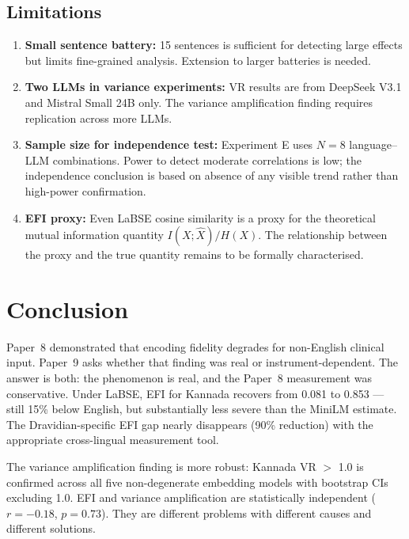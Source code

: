 \documentclass[11pt,a4paper]{article}
\begin{document}
\subsection{Limitations}

\begin{enumerate}
    \item \textbf{Small sentence battery:} 15 sentences is sufficient for detecting large
    effects but limits fine-grained analysis. Extension to larger batteries is needed.
    \item \textbf{Two LLMs in variance experiments:} VR results are from DeepSeek V3.1
    and Mistral Small 24B only. The variance amplification finding requires replication
    across more LLMs.
    \item \textbf{Sample size for independence test:} Experiment E uses $N = 8$ language--
    LLM combinations. Power to detect moderate correlations is low; the independence
    conclusion is based on absence of any visible trend rather than high-power
    confirmation.
    \item \textbf{EFI proxy:} Even LaBSE cosine similarity is a proxy for the theoretical
    mutual information quantity $I(X;\hat{X})/H(X)$. The relationship between the proxy
    and the true quantity remains to be formally characterised.
\end{enumerate}

\section{Conclusion}

Paper~8 demonstrated that encoding fidelity degrades for non-English clinical input.
Paper~9 asks whether that finding was real or instrument-dependent. The answer is both:
the phenomenon is real, and the Paper~8 measurement was conservative. Under LaBSE, EFI
for Kannada recovers from 0.081 to 0.853 --- still 15\% below English, but substantially
less severe than the MiniLM estimate. The Dravidian-specific EFI gap nearly disappears
(90\% reduction) with the appropriate cross-lingual measurement tool.

The variance amplification finding is more robust: Kannada VR $>$ 1.0 is confirmed across
all five non-degenerate embedding models with bootstrap CIs excluding 1.0. EFI and
variance amplification are statistically independent ($r = -0.18$, $p = 0.73$). They are
different problems with different causes and different solutions.
\end{document}
